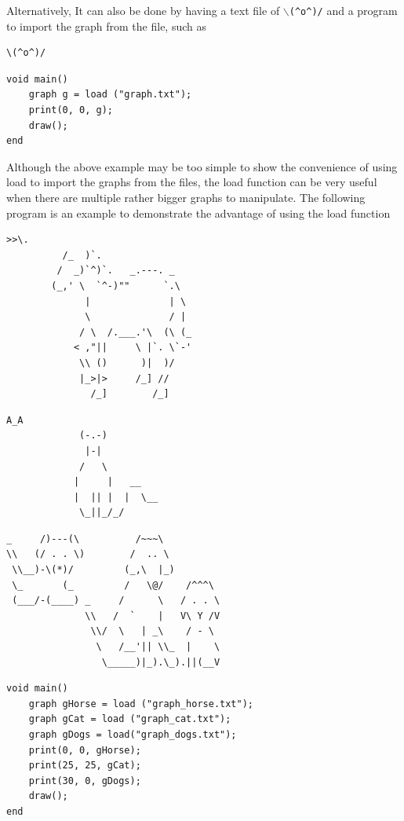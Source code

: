 \documentclass[11pt,letterpaper]{article}
\begin{document}
Alternatively, It can also be done by having a text file of \texttt{$\backslash$(\^{}o\^{})/} and a program to import the graph from the file, such as

\begin{lstlisting}[caption=graph.txt, label=hail_face, captionpos=b, tabsize=4]
						\(^o^)/
\end{lstlisting}

\begin{lstlisting}[caption=hailv2.adele, label=hailv2, captionpos=b, tabsize=4, frame=single]
void main()
	graph g = load ("graph.txt");
	print(0, 0, g);
	draw();
end
\end{lstlisting}

Although the above example may be too simple to show the convenience of using load to import the graphs from the files, the load function can be very useful when there are multiple rather bigger graphs to manipulate. The following program is an example to demonstrate the advantage of using the load function
\pagebreak
\begin{lstlisting}[caption=graph\_horse.txt, label=horse, captionpos=b]
		   >>\.
		  /_  )`.
		 /  _)`^)`.   _.---. _
		(_,' \  `^-)""      `.\
		      |              | \
		      \              / |
		     / \  /.___.'\  (\ (_
		    < ,"||     \ |`. \`-'
		     \\ ()      )|  )/
		     |_>|>     /_] //
		       /_]        /_]
\end{lstlisting}

\begin{lstlisting}[caption=graph\_cat.txt, label=cat, captionpos=b]
			  A_A
			 (-.-)
			  |-|
			 /   \
			|     |   __
			|  || |  |  \__
			 \_||_/_/
\end{lstlisting}

\begin{lstlisting}[caption=graph\_dogs.txt, label=dogs, captionpos=b]
_     /)---(\          /~~~\
\\   (/ . . \)        /  .. \
 \\__)-\(*)/         (_,\  |_)
 \_       (_         /   \@/    /^^^\
 (___/-(____) _     /      \   / . . \
              \\   /  `    |   V\ Y /V
               \\/  \   | _\    / - \
                \   /__'|| \\_  |    \
                 \_____)|_).\_).||(__V
\end{lstlisting}

\begin{lstlisting}[caption=animals.adele, label=animal, captionpos=b, tabsize=4, frame=single]
void main()
	graph gHorse = load ("graph_horse.txt");
	graph gCat = load ("graph_cat.txt");
	graph gDogs = load("graph_dogs.txt");
	print(0, 0, gHorse);
	print(25, 25, gCat);
	print(30, 0, gDogs);
	draw();
end
\end{lstlisting}
\end{document}
